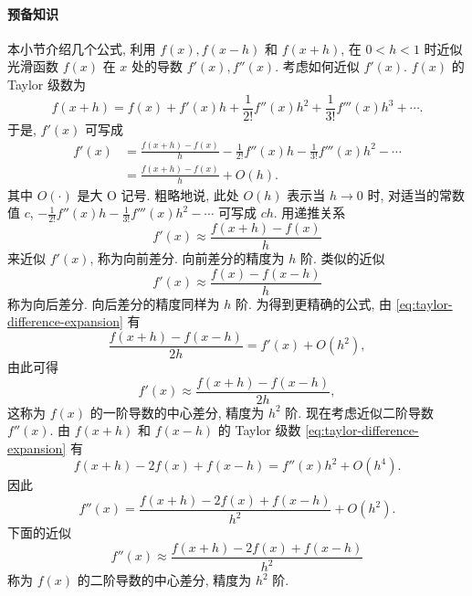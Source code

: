 \paragraph{{预备知识}}\label{subsec:difference-preliminary}
{本小节介绍几个公式, 利用 $f(x),f(x-h)$ 和 $f(x+h)$, 在 $0<h<1$ 时近似光滑函数 $f(x)$ 在 $x$ 处的导数 $f'(x),f''(x)$. 考虑如何近似 $f'(x)$. $f(x)$ 的 Taylor 级数为}
\begin{equation}\label{eq:taylor-difference-expansion}
f(x+h)=f(x)+f'(x)h+\frac{1}{2!}f''(x)h^2+\frac{1}{3!}f'''(x)h^3+\cdots.
\end{equation}
{于是, $f'(x)$ 可写成}
\[\begin{aligned}
f'(x)&=\frac{f(x+h)-f(x)}{h}-\frac{1}{2!}f''(x)h-\frac{1}{3!}f'''(x)h^2-\cdots\\
&=\frac{f(x+h)-f(x)}{h}+O(h).
\end{aligned}\]
{其中 $O(\cdot)$ 是大 O 记号. 粗略地说, 此处 $O(h)$ 表示当 $h\to0$ 时, 对适当的常数值 $c$, $-\frac{1}{2!}f''(x)h-\frac{1}{3!}f'''(x)h^2-\cdots$ 可写成 $ch$. 用递推关系}
\begin{equation}\label{eq:forward-difference}
f'(x)\approx\frac{f(x+h)-f(x)}{h}
\end{equation}
{来近似 $f'(x)$, 称为向前差分. 向前差分的精度为 $h$ 阶. 类似的近似}
\begin{equation}\label{eq:backward-difference}
f'(x)\approx\frac{f(x)-f(x-h)}{h}
\end{equation}
{称为向后差分. 向后差分的精度同样为 $h$ 阶. 为得到更精确的公式, 由 \eqref{eq:taylor-difference-expansion} 有}
\[\frac{f(x+h)-f(x-h)}{2h}=f'(x)+O(h^2),\]
{由此可得}
\begin{equation}\label{eq:central-first-difference}
f'(x)\approx\frac{f(x+h)-f(x-h)}{2h},
\end{equation}
{这称为 $f(x)$ 的一阶导数的中心差分, 精度为 $h^2$ 阶.}
{现在考虑近似二阶导数 $f''(x)$. 由 $f(x+h)$ 和 $f(x-h)$ 的 Taylor 级数 \eqref{eq:taylor-difference-expansion} 有}
\[f(x+h)-2f(x)+f(x-h)=f''(x)h^2+O(h^4).\]
{因此}
\[f''(x)=\frac{f(x+h)-2f(x)+f(x-h)}{h^2}+O(h^2).\]
{下面的近似}
\begin{equation}\label{eq:central-second-difference}
f''(x)\approx\frac{f(x+h)-2f(x)+f(x-h)}{h^2}
\end{equation}
{称为 $f(x)$ 的二阶导数的中心差分, 精度为 $h^2$ 阶.}
